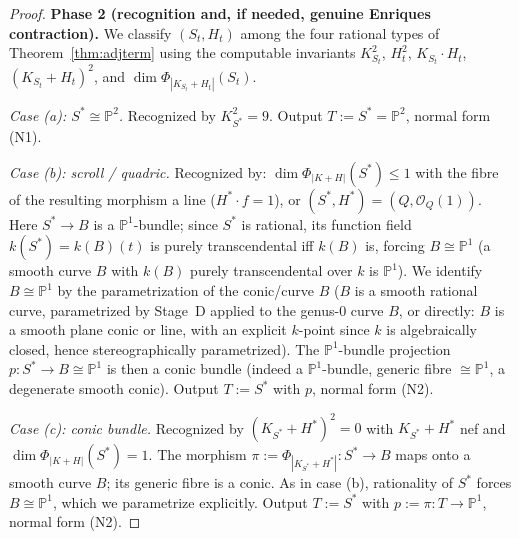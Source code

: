 \documentclass{amsart}
\theoremstyle{plain}
\theoremstyle{definition}
\newcommand{\PP}{\mathbb{P}}
\newcommand{\cO}{\mathcal{O}}
\begin{document}
\begin{proof}
\medskip\noindent\textbf{Phase 2 (recognition and, if needed, genuine Enriques
contraction).}  We classify $(S_t,H_t)$ among the four rational types of
Theorem~\ref{thm:adjterm} using the computable invariants $K_{S_t}^2$,
$H_t^2$, $K_{S_t}\cdot H_t$, $(K_{S_t}+H_t)^2$, and
$\dim\Phi_{|K_{S_t}+H_t|}(S_t)$.

\emph{Case (a): $S^\ast\cong\PP^2$.}  Recognized by $K_{S^\ast}^2=9$.  Output
$T:=S^\ast=\PP^2$, normal form (N1).

\emph{Case (b): scroll / quadric.}  Recognized by: $\dim\Phi_{|K+H|}(S^\ast)\le1$
with the fibre of the resulting morphism a line ($H^\ast\cdot f=1$), or
$(S^\ast,H^\ast)=(Q,\cO_Q(1))$.  Here $S^\ast\to B$ is a $\PP^1$-bundle; since
$S^\ast$ is rational, its function field $k(S^\ast)=k(B)(t)$ is purely
transcendental iff $k(B)$ is, forcing $B\cong\PP^1$ (a smooth curve $B$ with
$k(B)$ purely transcendental over $k$ is $\PP^1$).  We identify $B\cong\PP^1$ by
the parametrization of the conic/curve $B$ \textup{(}$B$ is a smooth rational
curve, parametrized by Stage~D applied to the genus-$0$ curve $B$, or directly:
$B$ is a smooth plane conic or line, with an explicit $k$-point since $k$ is
algebraically closed, hence stereographically parametrized\textup{)}.  The
$\PP^1$-bundle projection $p\colon S^\ast\to B\cong\PP^1$ is then a conic bundle
(indeed a $\PP^1$-bundle, generic fibre $\cong\PP^1$, a degenerate smooth conic).
Output $T:=S^\ast$ with $p$, normal form (N2).

\emph{Case (c): conic bundle.}  Recognized by $(K_{S^\ast}+H^\ast)^2=0$ with
$K_{S^\ast}+H^\ast$ nef and $\dim\Phi_{|K+H|}(S^\ast)=1$.  The morphism
$\pi:=\Phi_{|K_{S^\ast}+H^\ast|}\colon S^\ast\to B$ maps onto a smooth curve $B$;
its generic fibre is a conic.  As in case (b), rationality of $S^\ast$ forces
$B\cong\PP^1$, which we parametrize explicitly.  Output $T:=S^\ast$ with
$p:=\pi\colon T\to\PP^1$, normal form (N2).


\end{proof}
\end{document}

